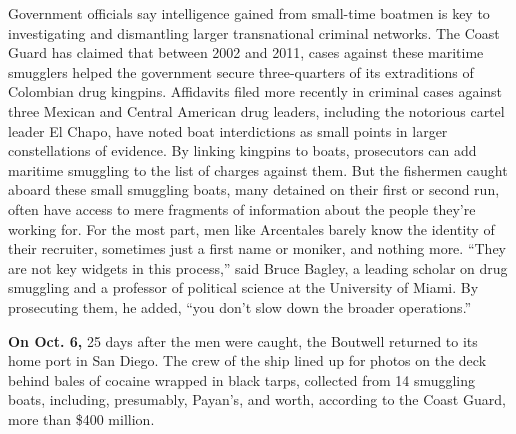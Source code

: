 Government officials say intelligence gained from small-time boatmen is
key to investigating and dismantling larger transnational criminal
networks. The Coast Guard has claimed that between 2002 and 2011, cases
against these maritime smugglers helped the government secure
three-quarters of its extraditions of Colombian drug kingpins.
Affidavits filed more recently in criminal cases against three Mexican
and Central American drug leaders, including the notorious cartel leader
El Chapo, have noted boat interdictions as small points in larger
constellations of evidence. By linking kingpins to boats, prosecutors
can add maritime smuggling to the list of charges against them. But the
fishermen caught aboard these small smuggling boats, many detained on
their first or second run, often have access to mere fragments of
information about the people they're working for. For the most part, men
like Arcentales barely know the identity of their recruiter, sometimes
just a first name or moniker, and nothing more. ``They are not key
widgets in this process,'' said Bruce Bagley, a leading scholar on drug
smuggling and a professor of political science at the University of
Miami. By prosecuting them, he added, ``you don't slow down the broader
operations.''

\textbf{On Oct. 6,} 25 days after the men were caught, the Boutwell
returned to its home port in San Diego. The crew of the ship lined up
for photos on the deck behind bales of cocaine wrapped in black tarps,
collected from 14 smuggling boats, including, presumably, Payan's, and
worth, according to the Coast Guard, more than \$400 million.

